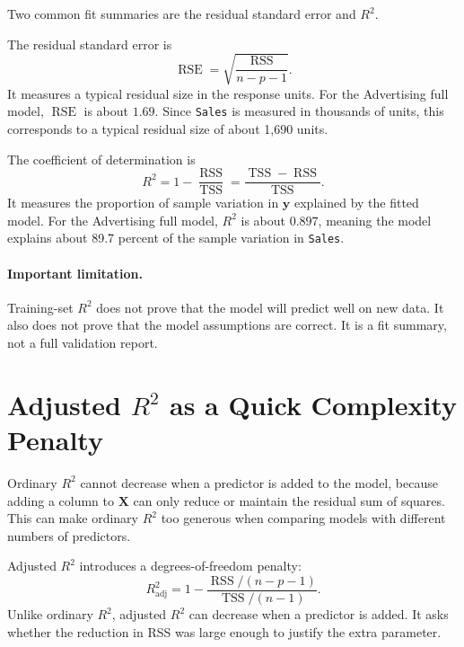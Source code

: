 Two common fit summaries are the residual standard error and \(R^2\).

The residual standard error is
\begin{equation}
  \operatorname{RSE}
  =\sqrt{\frac{\operatorname{RSS}}{n-p-1}}.
\end{equation}
It measures a typical residual size in the response units.  For the Advertising full model, \(\operatorname{RSE}\) is about \(1.69\).  Since \texttt{Sales} is measured in thousands of units, this corresponds to a typical residual size of about 1,690 units.

The coefficient of determination is
\begin{equation}
  R^2=1-\frac{\operatorname{RSS}}{\operatorname{TSS}}
  =\frac{\operatorname{TSS}-\operatorname{RSS}}{\operatorname{TSS}}.
\end{equation}
It measures the proportion of sample variation in \(\mathbf{y}\) explained by the fitted model.  For the Advertising full model, \(R^2\) is about \(0.897\), meaning the model explains about 89.7 percent of the sample variation in \texttt{Sales}.

\paragraph{Important limitation.}
Training-set \(R^2\) does not prove that the model will predict well on new data.  It also does not prove that the model assumptions are correct.  It is a fit summary, not a full validation report.

\section{Adjusted \texorpdfstring{\(R^2\)}{R2} as a Quick Complexity Penalty}

Ordinary \(R^2\) cannot decrease when a predictor is added to the model, because adding a column to \(\mathbf{X}\) can only reduce or maintain the residual sum of squares.  This can make ordinary \(R^2\) too generous when comparing models with different numbers of predictors.

Adjusted \(R^2\) introduces a degrees-of-freedom penalty:
\begin{equation}
  R^2_{\text{adj}}
  =1-\frac{\operatorname{RSS}/(n-p-1)}{\operatorname{TSS}/(n-1)}.
\end{equation}
Unlike ordinary \(R^2\), adjusted \(R^2\) can decrease when a predictor is added.  It asks whether the reduction in RSS was large enough to justify the extra parameter.

